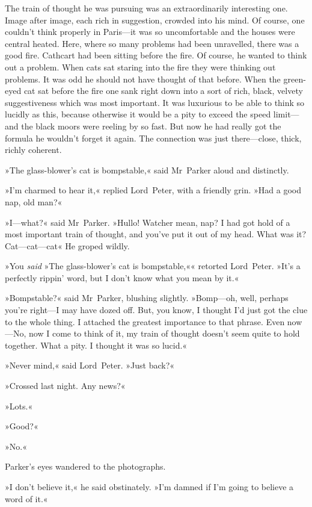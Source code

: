 The train of thought he was pursuing was an extraordinarily interesting one. Image after image, each rich in suggestion, crowded into his mind. Of course, one couldn't think properly in Paris—it was so uncomfortable and the houses were central heated. Here, where so many problems had been unravelled, there was a good fire. Cathcart had been sitting before the fire. Of course, he wanted to think out a problem.  When cats sat staring into the fire they were thinking out problems. It was odd he should not have thought of that before. When the green-eyed cat sat before the fire one sank right down into a sort of rich, black, velvety suggestiveness which was most important. It was luxurious to be able to think so lucidly as this, because otherwise it would be a pity to exceed the speed limit—and the black moors were reeling by so fast.  But now he had really got the formula he wouldn't forget it again. The connection was just there—close, thick, richly coherent.

»The glass-blower's cat is bompstable,« said Mr~Parker aloud and distinctly.

»I'm charmed to hear it,« replied Lord~Peter, with a friendly grin.  »Had a good nap, old man?«

»I—what?« said Mr~Parker. »Hullo! Watcher mean, nap? I had got hold of a most important train of thought, and you've put it out of my head.  What was it? Cat—cat—cat\longdash« He groped wildly.

»You \textit{said} »The glass-blower's cat is bompstable,«« retorted Lord~Peter. »It's a perfectly rippin' word, but I don't know what you mean by it.«

»Bompstable?« said Mr~Parker, blushing slightly. »Bomp—oh, well, perhaps you're right—I may have dozed off. But, you know, I thought I'd just got the clue to the whole thing. I attached the greatest importance to that phrase. Even now—No, now I come to think of it, my train of thought doesn't seem quite to hold together. What a pity. I thought it was so lucid.«

»Never mind,« said Lord~Peter. »Just back?«

»Crossed last night. Any news?«

»Lots.«

»Good?«

»No.«

Parker's eyes wandered to the photographs.

»I don't believe it,« he said obstinately. »I'm damned if I'm going to believe a word of it.«

